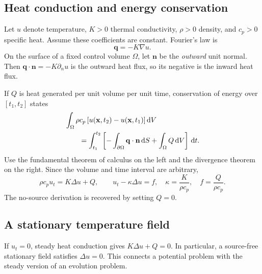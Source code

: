\documentclass[11pt,a4paper]{article}
\newcommand{\dd}{\,\mathrm{d}}
\newif\ifteachernotes\teachernotesfalse %
\newcommand{\teachernote}[1]{\ifteachernotes\par\smallskip
  \noindent\textit{Instructor note.} #1\par\smallskip\fi}
\begin{document}
\subsection{Heat conduction and energy conservation}
Let $u$ denote temperature, $K>0$ thermal conductivity, $\rho>0$ density, and
$c_p>0$ specific heat. Assume these coefficients are constant. Fourier's law is
\begin{equation}
 \mathbf{q}=-K\nabla u.
\end{equation}
On the surface of a fixed control volume $\Omega$, let $\mathbf n$ be the
\emph{outward} unit normal. Then $\mathbf q\cdot\mathbf n=-K\partial_nu$ is the
outward heat flux, so its negative is the inward heat flux.
\begin{center}
\end{center}
If $Q$ is heat generated per unit volume per unit time, conservation of energy
over $[t_1,t_2]$ states
\begin{align}
 &\int_\Omega\rho c_p\,[u(\mathbf{x},t_2)-u(\mathbf{x},t_1)]\dd V\notag\\
 &\qquad=\int_{t_1}^{t_2}\left[
       -\int_{\partial\Omega}\mathbf q\cdot\mathbf n\dd S
       +\int_\Omega Q\dd V\right]\dd t.
\end{align}
Use the fundamental theorem of calculus on the left and the divergence theorem
on the right. Since the volume and time interval are arbitrary,
\begin{equation}
 \rho c_pu_t=K\Delta u+Q,\qquad
 \boxed{u_t-\kappa\Delta u=f,\quad
   \kappa=\frac{K}{\rho c_p},\quad f=\frac{Q}{\rho c_p}.}
\end{equation}
The no-source derivation is recovered by setting $Q=0$.
\teachernote{For spatially varying $K$, replace $K\Delta u$ by
 $\nabla\cdot(K\nabla u)$ before dividing by $\rho c_p$.}

\subsection{A stationary temperature field}
If $u_t=0$, steady heat conduction gives $K\Delta u+Q=0$.
In particular, a source-free stationary field satisfies $\Delta u=0$.
This connects a potential problem with the steady version of an evolution problem.
\end{document}
